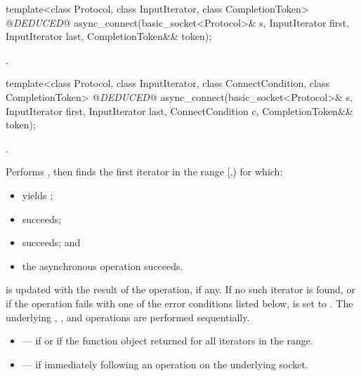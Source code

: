 \begin{itemdecl}
template<class Protocol, class InputIterator, class CompletionToken>
  @\textit{DEDUCED}@ async_connect(basic_socket<Protocol>& s,
                        InputIterator first, InputIterator last,
                        CompletionToken&& token);
\end{itemdecl}

\begin{itemdescr}
\pnum
\returns {}.
\end{itemdescr}

\begin{itemdecl}
template<class Protocol, class InputIterator,
  class ConnectCondition, class CompletionToken>
    @\textit{DEDUCED}@ async_connect(basic_socket<Protocol>& s,
                          InputIterator first, InputIterator last,
                          ConnectCondition c,
                          CompletionToken&& token);
\end{itemdecl}

\begin{itemdescr}
\pnum
\completionsig {}.

\pnum
\effects Performs , then finds the first iterator  in the range [,) for which:
\begin{itemize}
\item
{} yields ;
\item
{} succeeds;
\item
{} succeeds; and
\item
 the asynchronous operation succeeds.
\end{itemize}
\pnum
{} is updated with the result of the  operation, if any. If no such iterator is found, or if the operation fails with one of the error conditions listed below,  is set to . \enternote The underlying , , and  operations are performed sequentially. \exitnote

\pnum
\errors
\begin{itemize}
\item
{} --- if  or if the function object  returned  for all iterators in the range.
\item
{} --- if  immediately following an  operation on the underlying socket.
\end{itemize}
\end{itemdescr}



